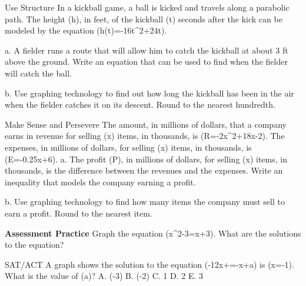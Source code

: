 \documentclass{article}
\newenvironment{practice}[2]{}{}        %
\newcommand{\answer}[1]{}               %
\newcommand{\placeholder}[2]{}          %
\begin{document}
\begin{practice}{31}{2}
Use Structure In a kickball game, a ball is kicked and travels along a parabolic path. The height (h), in feet, of the kickball (t) seconds after the kick can be modeled by the equation (h(t)=-16t^2+24t).
\placeholder{illustration}{Kickball illustration: player in teal and black kicking an orange ball, trajectory above player labeled h(t)=-16t^2+24t.}
a. A fielder runs a route that will allow him to catch the kickball at about 3 ft above the ground. Write an equation that can be used to find when the fielder will catch the ball.
\answer{(-16t^2+24t=3)}
b. Use graphing technology to find out how long the kickball has been in the air when the fielder catches it on its descent. Round to the nearest hundredth.
\answer{about 1.36 s}
\end{practice}
\begin{practice}{32}{3}
Make Sense and Persevere The amount, in millions of dollars, that a company earns in revenue for selling (x) items, in thousands, is (R=-2x^2+18x-2). The expenses, in millions of dollars, for selling (x) items, in thousands, is (E=-0.25x+6).
a. The profit (P), in millions of dollars, for selling (x) items, in thousands, is the difference between the revenues and the expenses. Write an inequality that models the company earning a profit.
\answer{(0<(-2x^2+18x-2)-(-0.25x+6)) or (0<-2x^2+18.25x-8)}
b. Use graphing technology to find how many items the company must sell to earn a profit. Round to the nearest item.
\answer{Between 462 and 8663 items}
\end{practice}
\begin{practice}{33}{1}
\textbf{Assessment Practice} Graph the equation (x^2-3=x+3). What are the solutions to the equation?
\placeholder{graph}{Teacher answer graph: unit grid, x and y axes with arrows, labels -2,O,2,4. Red upward parabola y=x^2-3 vertex (0,-3); blue line y=x+3. Intersections (-2,1) and (3,6). Window approximately [-4,6] on each axis. Curves have arrows at both ends.}
\answer{(x=-2) and (x=3)}
\end{practice}
\begin{practice}{34}{2}
SAT/ACT A graph shows the solution to the equation (-\frac12x+=-x+a) is (x=-1). What is the value of (a)?
A. (-3)
B. (-2)
C. 1
D. 2
E. 3
\answer{E}
\end{practice}
\end{document}
